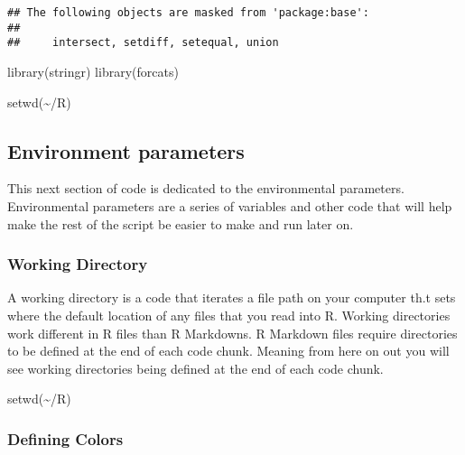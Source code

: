 \documentclass[
]{article}
\newenvironment{Shaded}{\begin{snugshade}}{\end{snugshade}}
\newcommand{\FunctionTok}[1]{\textcolor[rgb]{0.00,0.00,0.00}{#1}}
\newcommand{\NormalTok}[1]{#1}
\newcommand{\StringTok}[1]{\textcolor[rgb]{0.31,0.60,0.02}{#1}}
\begin{document}
\begin{verbatim}
## The following objects are masked from 'package:base':
## 
##     intersect, setdiff, setequal, union
\end{verbatim}

\begin{Shaded}
\begin{Highlighting}[]
\FunctionTok{library}\NormalTok{(stringr)}
\FunctionTok{library}\NormalTok{(forcats)}

\FunctionTok{setwd}\NormalTok{(}\StringTok{\textquotesingle{}\textasciitilde{}/R\textquotesingle{}}\NormalTok{)}
\end{Highlighting}
\end{Shaded}

\hypertarget{environment-parameters}{%
\subsection{\texorpdfstring{\textbf{Environment
parameters}}{Environment parameters}}\label{environment-parameters}}

This next section of code is dedicated to the environmental parameters.
Environmental parameters are a series of variables and other code that
will help make the rest of the script be easier to make and run later
on.

\hypertarget{working-directory}{%
\subsubsection{\texorpdfstring{\textbf{Working
Directory}}{Working Directory}}\label{working-directory}}

A working directory is a code that iterates a file path on your computer
th.t sets where the default location of any files that you read into R.
Working directories work different in R files than R Markdowns. R
Markdown files require directories to be defined at the end of each code
chunk. Meaning from here on out you will see working directories being
defined at the end of each code chunk.

\begin{Shaded}
\begin{Highlighting}[]
\FunctionTok{setwd}\NormalTok{(}\StringTok{\textquotesingle{}\textasciitilde{}/R\textquotesingle{}}\NormalTok{)}
\end{Highlighting}
\end{Shaded}

\hypertarget{defining-colors}{%
\subsubsection{\texorpdfstring{\textbf{Defining
Colors}}{Defining Colors}}\label{defining-colors}}
\end{document}
